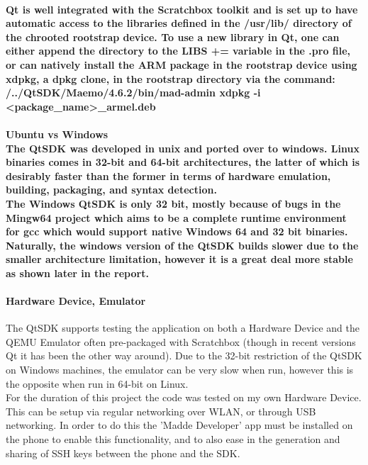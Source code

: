 \documentclass[11pt]{article} %
\begin{document}
\paragraph{Qt is well integrated with the Scratchbox toolkit and is set up to have automatic access to the libraries defined in the /usr/lib/ directory of the chrooted rootstrap device. To use a new library in Qt, one can either append the directory to the LIBS += variable in the .pro file, or can natively install the ARM package in the rootstrap device using xdpkg, a dpkg clone, in the rootstrap directory via the command:\\
/../QtSDK/Maemo/4.6.2/bin/mad-admin xdpkg -i <package\_name>\_armel.deb
}

\paragraph{Ubuntu vs Windows\\
The QtSDK was developed in unix and ported over to windows. Linux binaries comes in 32-bit and 64-bit architectures, the latter of which is desirably faster than the former in terms of hardware emulation, building, packaging, and syntax detection.\\The Windows QtSDK is only 32 bit, mostly because of bugs in the Mingw64 project which aims to be a complete runtime environment for gcc which would support native Windows 64 and 32 bit binaries.\\
Naturally, the windows version of the QtSDK builds slower due to the smaller architecture limitation, however it is a great deal more stable as shown later in the report.
}

\paragraph{Hardware Device, Emulator}{
The QtSDK supports testing the application on both a Hardware Device and the QEMU Emulator often pre-packaged with Scratchbox (though in recent versions Qt it has been the other way around). Due to the 32-bit restriction of the QtSDK on Windows machines, the emulator can be very slow when run, however this is the opposite when run in 64-bit on Linux.\\
For the duration of this project the code was tested on my own Hardware Device. This can be setup via regular networking over WLAN, or through USB networking. In order to do this the 'Madde Developer' app must be installed on the phone to enable this functionality, and to also ease in the generation and sharing of SSH keys between the phone and the SDK.}
\end{document}
